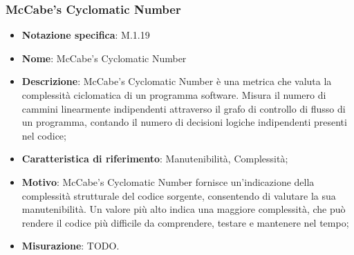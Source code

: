\subsubsection{McCabe’s Cyclomatic Number}
\begin{itemize}
    \item \textbf{Notazione specifica}: M.1.19
    \item \textbf{Nome}: McCabe’s Cyclomatic Number
    \item \textbf{Descrizione}: McCabe’s Cyclomatic Number è una metrica che valuta la complessità ciclomatica di un programma software. Misura il numero di cammini linearmente indipendenti attraverso il grafo di controllo di flusso di un programma, contando il numero di decisioni logiche indipendenti presenti nel codice;
    \item \textbf{Caratteristica di riferimento}: Manutenibilità, Complessità;
    \item \textbf{Motivo}: McCabe’s Cyclomatic Number fornisce un'indicazione della complessità strutturale del codice sorgente, consentendo di valutare la sua manutenibilità. Un valore più alto indica una maggiore complessità, che può rendere il codice più difficile da comprendere, testare e mantenere nel tempo;
    \item \textbf{Misurazione}: TODO.
\end{itemize}
